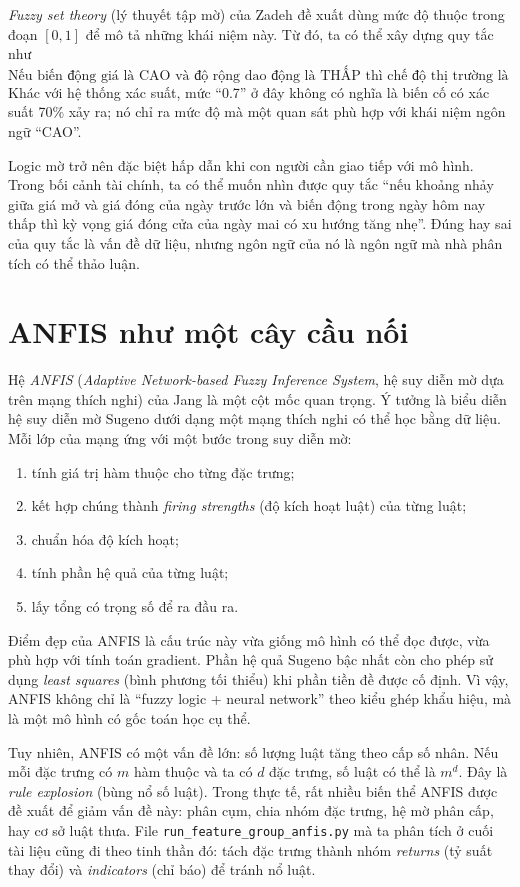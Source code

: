 \emph{Fuzzy set theory} (lý thuyết tập mờ) của Zadeh \citep{zadeh1965fuzzy} đề xuất dùng mức độ thuộc trong đoạn $[0,1]$ để mô tả những khái niệm này. Từ đó, ta có thể xây dựng quy tắc như
\[
\text{Nếu biến động giá là CAO và độ rộng dao động là THẤP thì chế độ thị trường là ỔN ĐỊNH.}
\]
Khác với hệ thống xác suất, mức ``0.7'' ở đây không có nghĩa là biến cố có xác suất 70\% xảy ra; nó chỉ ra mức độ mà một quan sát phù hợp với khái niệm ngôn ngữ ``CAO''.

Logic mờ trở nên đặc biệt hấp dẫn khi con người cần giao tiếp với mô hình. Trong bối cảnh tài chính, ta có thể muốn nhìn được quy tắc ``nếu khoảng nhảy giữa giá mở và giá đóng của ngày trước lớn và biến động trong ngày hôm nay thấp thì kỳ vọng giá đóng cửa của ngày mai có xu hướng tăng nhẹ''. Đúng hay sai của quy tắc là vấn đề dữ liệu, nhưng ngôn ngữ của nó là ngôn ngữ mà nhà phân tích có thể thảo luận.

\section{ANFIS như một cây cầu nối}

Hệ \emph{ANFIS} (\emph{Adaptive Network-based Fuzzy Inference System}, hệ suy diễn mờ dựa trên mạng thích nghi) của Jang \citep{jang1993anfis} là một cột mốc quan trọng. Ý tưởng là biểu diễn hệ suy diễn mờ Sugeno dưới dạng một mạng thích nghi có thể học bằng dữ liệu. Mỗi lớp của mạng ứng với một bước trong suy diễn mờ:

\begin{enumerate}
\item tính giá trị hàm thuộc cho từng đặc trưng;
\item kết hợp chúng thành \emph{firing strengths} (độ kích hoạt luật) của từng luật;
\item chuẩn hóa độ kích hoạt;
\item tính phần hệ quả của từng luật;
\item lấy tổng có trọng số để ra đầu ra.
\end{enumerate}

Điểm đẹp của ANFIS là cấu trúc này vừa giống mô hình có thể đọc được, vừa phù hợp với tính toán gradient. Phần hệ quả Sugeno bậc nhất còn cho phép sử dụng \emph{least squares} (bình phương tối thiểu) khi phần tiền đề được cố định. Vì vậy, ANFIS không chỉ là ``fuzzy logic + neural network'' theo kiểu ghép khẩu hiệu, mà là một mô hình có gốc toán học cụ thể.

Tuy nhiên, ANFIS có một vấn đề lớn: số lượng luật tăng theo cấp số nhân. Nếu mỗi đặc trưng có $m$ hàm thuộc và ta có $d$ đặc trưng, số luật có thể là $m^d$. Đây là \emph{rule explosion} (bùng nổ số luật). Trong thực tế, rất nhiều biến thể ANFIS được đề xuất để giảm vấn đề này: phân cụm, chia nhóm đặc trưng, hệ mờ phân cấp, hay cơ sở luật thưa. File \texttt{run\_feature\_group\_anfis.py} mà ta phân tích ở cuối tài liệu cũng đi theo tinh thần đó: tách đặc trưng thành nhóm \emph{returns} (tỷ suất thay đổi) và \emph{indicators} (chỉ báo) để tránh nổ luật.


